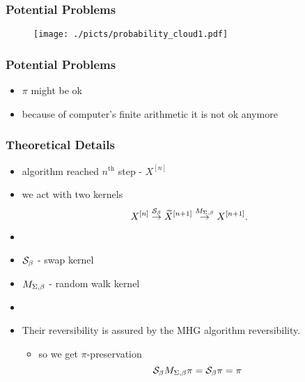 
\begin{frame}
		\frametitle{ Potential Problems }

	\begin{center}
		\begin{figure}\texttt{[image: ./picts/probability\_cloud1.pdf]}\end{figure}	
	\end{center}
\end{frame}



\begin{frame}
		\frametitle{ Potential Problems }

	\begin{itemize}
		\item $\pi$ might be ok 
		\item because of computer's finite arithmetic it is not ok anymore
	\end{itemize}

\end{frame}



\begin{frame}
		\frametitle{ Theoretical Details }

	\begin{itemize}
		\item[] algorithm reached $n^\text{th}$ step - $X^{[n]}$
		\item[] we act with two kernels
 $$X^{[n]} \overset{\mathcal{S}_{\beta}}{\rightarrow} \widetilde{X}^{[n +1]} \overset{M_{\Sigma,\beta}}{\rightarrow} X^{[n + 1]}.$$
		
		\item[]
		\item $\mathcal{S}_{\beta}$ - swap kernel
		\item $M_{\Sigma,\beta}$ - random walk kernel
		\item[]
		\item Their reversibility is assured by the MHG algorithm reversibility. 
		\begin{itemize}
			\item[] so we get $\pi$-preservation 
			$$ \mathcal{S}_{\beta} M_{\Sigma,\beta} \pi =  \mathcal{S}_{\beta} \pi = \pi$$
		\end{itemize}
	\end{itemize}

\end{frame}
